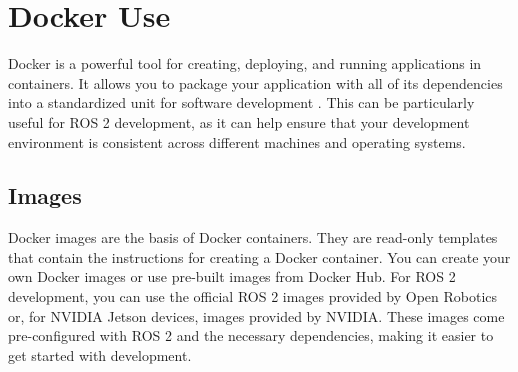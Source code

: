 %
%
%
%

\section{Docker Use}
\label{sec:docker-setup}

Docker is a powerful tool for creating, deploying, and running applications in containers. It allows you to package your application with all of its dependencies into a standardized unit for software development \autocite{ABOUTDOCKER}.
This can be particularly useful for ROS 2 development, as it can help ensure that your development environment is consistent across different machines and operating systems.



\bigskip
\subsection{Images}

Docker images are the basis of Docker containers. They are read-only templates that contain the instructions for creating a Docker container. You can create your own Docker images or use pre-built images from Docker Hub. For ROS 2 development, you can use the official ROS 2 images provided by Open Robotics or, for NVIDIA Jetson devices, images provided by NVIDIA. These images come pre-configured with ROS 2 and the necessary dependencies, making it easier to get started with development.

